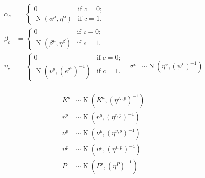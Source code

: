 \documentclass[11pt,a4paper]{article}
\begin{document}
\begin{align*}
\alpha_{c}&=\begin{cases}
0  & \text{if } c=0;\\
\operatorname{N}(\alpha^{\mu},\eta^{\alpha})  & \text{if } c=1.
\end{cases}
\\
\beta_{c}&=\begin{cases}
0  & \text{if } c=0;\\
\operatorname{N}(\beta^{\mu},\eta^{\beta}) & \text{if } c=1.
\end{cases}
\\
\upsilon_{c}&=\begin{cases}
0  & \text{if } c=0;\\
\operatorname{N}(\upsilon^p,({e^{\sigma^{\upsilon}}})^{-1}) & \text{if } c=1.
\end{cases}
&\sigma^{\upsilon} &\sim \operatorname{N}(\eta^{\upsilon}, (\psi^{\upsilon})^{-1} )\\
\end{align*}

\begin{align*}
K^p &\sim \operatorname{N}(K^\mu, ({\eta^{K,p}})^{-1} )\\
r^p &\sim \operatorname{N}(r^\mu, ({\eta^{r,p}})^{-1} )\\
\nu^p &\sim \operatorname{N}(\nu^\mu, ({\eta}^{\nu,p})^{-1} )\\
\upsilon^p &\sim \operatorname{N}(\upsilon^\mu, (\eta^{\upsilon,p})^{-1} )\\
P &\sim \operatorname{N}(P^\mu, ({\eta^{P}})^{-1} )\\
\end{align*}

\newpage





\end{document}
